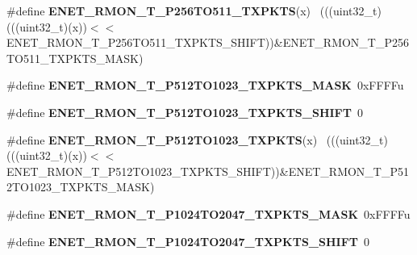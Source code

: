 \begin{DoxyCompactItemize}
\item 
\hypertarget{group___e_n_e_t___register___masks_ga2e0f64ff6f4da1f000a10b65e385852c}{}\#define {\bfseries E\+N\+E\+T\+\_\+\+R\+M\+O\+N\+\_\+\+T\+\_\+\+P256\+T\+O511\+\_\+\+T\+X\+P\+K\+T\+S}(x)                ~(((uint32\+\_\+t)(((uint32\+\_\+t)(x))$<$$<$E\+N\+E\+T\+\_\+\+R\+M\+O\+N\+\_\+\+T\+\_\+\+P256\+T\+O511\+\_\+\+T\+X\+P\+K\+T\+S\+\_\+\+S\+H\+I\+F\+T))\&E\+N\+E\+T\+\_\+\+R\+M\+O\+N\+\_\+\+T\+\_\+\+P256\+T\+O511\+\_\+\+T\+X\+P\+K\+T\+S\+\_\+\+M\+A\+S\+K)\label{group___e_n_e_t___register___masks_ga2e0f64ff6f4da1f000a10b65e385852c}

\item 
\hypertarget{group___e_n_e_t___register___masks_gaf14272bdf0f12949bf600b571553adcb}{}\#define {\bfseries E\+N\+E\+T\+\_\+\+R\+M\+O\+N\+\_\+\+T\+\_\+\+P512\+T\+O1023\+\_\+\+T\+X\+P\+K\+T\+S\+\_\+\+M\+A\+S\+K}~0x\+F\+F\+F\+Fu\label{group___e_n_e_t___register___masks_gaf14272bdf0f12949bf600b571553adcb}

\item 
\hypertarget{group___e_n_e_t___register___masks_ga4a580b8a12cf238b78636beddc069555}{}\#define {\bfseries E\+N\+E\+T\+\_\+\+R\+M\+O\+N\+\_\+\+T\+\_\+\+P512\+T\+O1023\+\_\+\+T\+X\+P\+K\+T\+S\+\_\+\+S\+H\+I\+F\+T}~0\label{group___e_n_e_t___register___masks_ga4a580b8a12cf238b78636beddc069555}

\item 
\hypertarget{group___e_n_e_t___register___masks_gab89a4c51d63623d547da1295a9fa8f8d}{}\#define {\bfseries E\+N\+E\+T\+\_\+\+R\+M\+O\+N\+\_\+\+T\+\_\+\+P512\+T\+O1023\+\_\+\+T\+X\+P\+K\+T\+S}(x)              ~(((uint32\+\_\+t)(((uint32\+\_\+t)(x))$<$$<$E\+N\+E\+T\+\_\+\+R\+M\+O\+N\+\_\+\+T\+\_\+\+P512\+T\+O1023\+\_\+\+T\+X\+P\+K\+T\+S\+\_\+\+S\+H\+I\+F\+T))\&E\+N\+E\+T\+\_\+\+R\+M\+O\+N\+\_\+\+T\+\_\+\+P512\+T\+O1023\+\_\+\+T\+X\+P\+K\+T\+S\+\_\+\+M\+A\+S\+K)\label{group___e_n_e_t___register___masks_gab89a4c51d63623d547da1295a9fa8f8d}

\item 
\hypertarget{group___e_n_e_t___register___masks_ga874fdbd030f1c4a977a7f989cb316a6c}{}\#define {\bfseries E\+N\+E\+T\+\_\+\+R\+M\+O\+N\+\_\+\+T\+\_\+\+P1024\+T\+O2047\+\_\+\+T\+X\+P\+K\+T\+S\+\_\+\+M\+A\+S\+K}~0x\+F\+F\+F\+Fu\label{group___e_n_e_t___register___masks_ga874fdbd030f1c4a977a7f989cb316a6c}

\item 
\hypertarget{group___e_n_e_t___register___masks_gaec4f9a8714bcb59e866d0e64b70f0fde}{}\#define {\bfseries E\+N\+E\+T\+\_\+\+R\+M\+O\+N\+\_\+\+T\+\_\+\+P1024\+T\+O2047\+\_\+\+T\+X\+P\+K\+T\+S\+\_\+\+S\+H\+I\+F\+T}~0\label{group___e_n_e_t___register___masks_gaec4f9a8714bcb59e866d0e64b70f0fde}


\end{DoxyCompactItemize}
